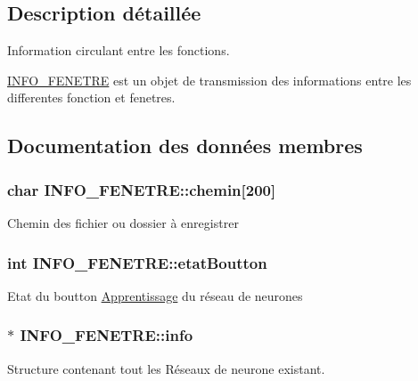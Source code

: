 \subsection{Description détaillée}
Information circulant entre les fonctions. 

\hyperlink{structINFO__FENETRE}{I\+N\+F\+O\+\_\+\+F\+E\+N\+E\+T\+RE} est un objet de transmission des informations entre les differentes fonction et fenetres. 

\subsection{Documentation des données membres}
\subsubsection[{\texorpdfstring{chemin}{chemin}}]{\setlength{\rightskip}{0pt plus 5cm}char I\+N\+F\+O\+\_\+\+F\+E\+N\+E\+T\+R\+E\+::chemin\mbox{[}200\mbox{]}}\hypertarget{structINFO__FENETRE_a45ef7a5a1039c09dcb82975b4a070c21}{}\label{structINFO__FENETRE_a45ef7a5a1039c09dcb82975b4a070c21}
Chemin des fichier ou dossier à enregistrer 
\subsubsection[{\texorpdfstring{etat\+Boutton}{etatBoutton}}]{\setlength{\rightskip}{0pt plus 5cm}int I\+N\+F\+O\+\_\+\+F\+E\+N\+E\+T\+R\+E\+::etat\+Boutton}\hypertarget{structINFO__FENETRE_ac0a8053617f09b84823e045c847bfdd6}{}\label{structINFO__FENETRE_ac0a8053617f09b84823e045c847bfdd6}
Etat du boutton \hyperlink{structApprentissage}{Apprentissage} du réseau de neurones 
\subsubsection[{\texorpdfstring{info}{info}}]{$\ast$ I\+N\+F\+O\+\_\+\+F\+E\+N\+E\+T\+R\+E\+::info}\hypertarget{structINFO__FENETRE_a11f9a61d9418b5b167ac2c2dbfa99dac}{}\label{structINFO__FENETRE_a11f9a61d9418b5b167ac2c2dbfa99dac}
Structure contenant tout les Réseaux de neurone existant. 
